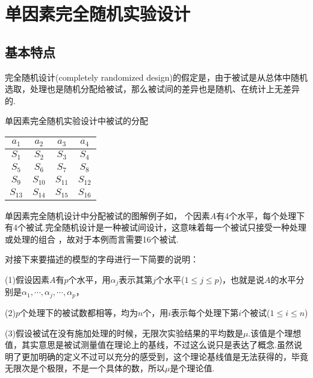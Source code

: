 \section{单因素完全随机实验设计}
\subsection{基本特点}

完全随机设计(completely randomized design)的假定是，由于被试是从总体中随机选取，处理也是随机分配给被试，那么被试间的差异也是随机、在统计上无差异的.



\begin{margintable}
	\centering
	\caption{单因素完全随机实验设计中被试的分配}
	{
		\begin{tabular}{cccc}
			\toprule
			$a_1$ & $a_2$ & $a_3$ & $a_4$ \\
			\midrule
			$S_1$ & $S_2$ & $S_3$ & $S_4$ \\
			$S_5$ & $S_6$ & $S_7$ & $S_8$ \\
			$S_9$ & $S_{10}$ & $S_{11}$ & $S_{12}$ \\
			$S_{13}$ & $S_{14}$ & $S_{15}$ & $S_{16}$ \\
			\bottomrule
		\end{tabular}
	}
\end{margintable}

单因素完全随机设计中分配被试的图解例子如，
个因素$A$有4个水平，每个处理下有4个被试.完全随机设计是一种被试间设计，这意味着每一个被试只接受一种处理或处理的组合
，故对于本例而言需要16个被试.

对接下来要描述的模型的字母进行一下简要的说明：

(1)假设因素$A$有$p$个水平，用$\alpha _j$表示其第$j$个水平($1 \leq j \leq p$)，也就是说$A$的水平分别是$\alpha _1,\cdots,\alpha _j,\cdots, \alpha _p$，

(2)$p$个处理下的被试数都相等，均为$n$个，用$i$表示每个处理下第$i$个被试($1 \leq i \leq n$)

(3)假设被试在没有施加处理的时候，无限次实验结果的平均数是$\mu$.该值是个理想值，其实意思是被试测量值在理论上的基线，不过这么说只是表达了概念.虽然说明了更加明确的定义不过可以充分的感受到，这个理论基线值是无法获得的，毕竟无限次是个极限，不是一个具体的数，所以$\mu$是个理论值.

